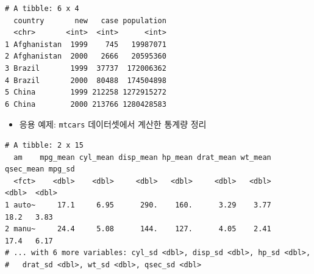 \documentclass[
  11pt,
]{krantz}
\newenvironment{Shaded}{\begin{snugshade}}{\end{snugshade}}
\newcommand{\CommentTok}[1]{\textcolor[rgb]{0.37,0.37,0.37}{\textit{#1}}}
\newcommand{\DataTypeTok}[1]{\textcolor[rgb]{0.27,0.27,0.27}{#1}}
\newcommand{\KeywordTok}[1]{\textcolor[rgb]{0.27,0.27,0.27}{\textbf{#1}}}
\newcommand{\NormalTok}[1]{#1}
\newcommand{\OperatorTok}[1]{\textcolor[rgb]{0.43,0.43,0.43}{\textbf{#1}}}
\newcommand{\StringTok}[1]{\textcolor[rgb]{0.5,0.5,0.5}{#1}}
\providecommand{\tightlist}{%
  \setlength{\itemsep}{0pt}\setlength{\parskip}{0pt}}
\begin{document}
\begin{verbatim}
# A tibble: 6 x 4
  country       new   case population
  <chr>       <int>  <int>      <int>
1 Afghanistan  1999    745   19987071
2 Afghanistan  2000   2666   20595360
3 Brazil       1999  37737  172006362
4 Brazil       2000  80488  174504898
5 China        1999 212258 1272915272
6 China        2000 213766 1280428583
\end{verbatim}

\normalsize

\begin{itemize}
\tightlist
\item
  응용 예제: \texttt{mtcars} 데이터셋에서 계산한 통계량 정리
\end{itemize}

\footnotesize

\begin{Shaded}
\end{Shaded}

\begin{verbatim}
# A tibble: 2 x 15
  am    mpg_mean cyl_mean disp_mean hp_mean drat_mean wt_mean qsec_mean mpg_sd
  <fct>    <dbl>    <dbl>     <dbl>   <dbl>     <dbl>   <dbl>     <dbl>  <dbl>
1 auto~     17.1     6.95      290.    160.      3.29    3.77      18.2   3.83
2 manu~     24.4     5.08      144.    127.      4.05    2.41      17.4   6.17
# ... with 6 more variables: cyl_sd <dbl>, disp_sd <dbl>, hp_sd <dbl>,
#   drat_sd <dbl>, wt_sd <dbl>, qsec_sd <dbl>
\end{verbatim}
\end{document}
